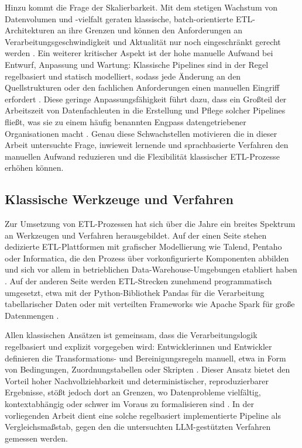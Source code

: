 Hinzu kommt die Frage der Skalierbarkeit. Mit dem stetigen Wachstum von Datenvolumen und -vielfalt geraten klassische, batch-orientierte \ac{ETL}-Architekturen an ihre Grenzen und können den Anforderungen an Verarbeitungsgeschwindigkeit und Aktualität nur noch eingeschränkt gerecht werden \autocite{walhaDataIntegrationTraditional2024,raviETLExtractTransform2025}. Ein weiterer kritischer Aspekt ist der hohe manuelle Aufwand bei Entwurf, Anpassung und Wartung: Klassische Pipelines sind in der Regel regelbasiert und statisch modelliert, sodass jede Änderung an den Quellstrukturen oder den fachlichen Anforderungen einen manuellen Eingriff erfordert \autocite{walhaDataIntegrationTraditional2024,nagabhyruBridgingTraditionalETL2022}. Diese geringe Anpassungsfähigkeit führt dazu, dass ein Großteil der Arbeitszeit von Datenfachleuten in die Erstellung und Pflege solcher Pipelines fließt, was sie zu einem häufig benannten Engpass datengetriebener Organisationen macht \autocite{mishraAutomatingDataIntegration2020,raviETLExtractTransform2025}. Genau diese Schwachstellen motivieren die in dieser Arbeit untersuchte Frage, inwieweit lernende und sprachbasierte Verfahren den manuellen Aufwand reduzieren und die Flexibilität klassischer \ac{ETL}-Prozesse erhöhen können.

\subsection{Klassische Werkzeuge und Verfahren}
\label{subsec:etl-werkzeuge}

Zur Umsetzung von \ac{ETL}-Prozessen hat sich über die Jahre ein breites Spektrum an Werkzeugen und Verfahren herausgebildet. Auf der einen Seite stehen dedizierte \ac{ETL}-Plattformen mit grafischer Modellierung wie Talend, Pentaho oder Informatica, die den Prozess über vorkonfigurierte Komponenten abbilden und sich vor allem in betrieblichen Data-Warehouse-Umgebungen etabliert haben \autocite{khanOverviewETLTechniques2024,boulahiaMulticriteriaEvaluationResearch2024}. Auf der anderen Seite werden \ac{ETL}-Strecken zunehmend programmatisch umgesetzt, etwa mit der Python-Bibliothek Pandas für die Verarbeitung tabellarischer Daten oder mit verteilten Frameworks wie Apache Spark für große Datenmengen \autocite{khanOverviewETLTechniques2024,walhaDataIntegrationTraditional2024}.

Allen klassischen Ansätzen ist gemeinsam, dass die Verarbeitungslogik regelbasiert und explizit vorgegeben wird: Entwicklerinnen und Entwickler definieren die Transformations- und Bereinigungsregeln manuell, etwa in Form von Bedingungen, Zuordnungstabellen oder Skripten \autocite{mishraAutomatingDataIntegration2020,boulahiaMulticriteriaEvaluationResearch2024}. Dieser Ansatz bietet den Vorteil hoher Nachvollziehbarkeit und deterministischer, reproduzierbarer Ergebnisse, stößt jedoch dort an Grenzen, wo Datenprobleme vielfältig, kontextabhängig oder schwer im Voraus zu formalisieren sind \autocite{walhaDataIntegrationTraditional2024,nagabhyruBridgingTraditionalETL2022}. In der vorliegenden Arbeit dient eine solche regelbasiert implementierte Pipeline als Vergleichsmaßstab, gegen den die untersuchten \ac{LLM}-gestützten Verfahren gemessen werden.

